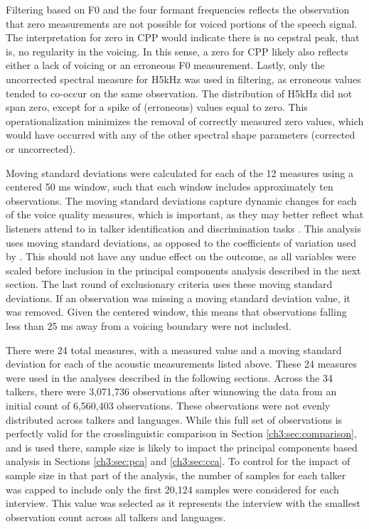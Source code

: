 Filtering based on F0 and the four formant frequencies reflects the observation that zero measurements are not possible for voiced portions of the speech signal. The interpretation for zero in CPP would indicate there is no cepstral peak, that is, no regularity in the voicing. In this sense, a zero for CPP likely also reflects either a lack of voicing or an erroneous F0 measurement. Lastly, only the uncorrected spectral measure for H5kHz was used in filtering, as erroneous values tended to co-occur on the same observation. The distribution of H5kHz did not span zero, except for a spike of (erroneous) values equal to zero. This operationalization minimizes the removal of correctly measured zero values, which would have occurred with any of the other spectral shape parameters (corrected or uncorrected). 

Moving standard deviations were calculated for each of the 12 measures using a centered 50 ms window, such that each window includes approximately ten observations. The moving standard deviations capture dynamic changes for each of the voice quality measures, which is important, as they may better reflect what listeners attend to in talker identification and discrimination tasks \citep{lee_2019_acoustic}. This analysis uses moving standard deviations, as opposed to the coefficients of variation used by \citet{lee_2019_acoustic}. This should not have any undue effect on the outcome, as all variables were scaled before inclusion in the principal components analysis described in the next section. The last round of exclusionary criteria uses these moving standard deviations. If an observation was missing a moving standard deviation value, it was removed. Given the centered window, this means that observations falling less than 25 ms away from a voicing boundary were not included. 

There were 24 total measures, with a measured value and a moving standard deviation for each of the acoustic measurements listed above. These 24 measures were used in the analyses described in the following sections. Across the 34 talkers, there were 3,071,736 observations after winnowing the data from an initial count of 6,560,403 observations. These observations were not evenly distributed across talkers and languages. While this full set of observations is perfectly valid for the crosslinguistic comparison in Section \ref{ch3:sec:comparison}, and is used there, sample size is likely to impact the principal components based analysis in Sections \ref{ch3:sec:pca} and \ref{ch3:sec:cca}. To control for the impact of sample size in that part of the analysis, the number of samples for each talker was capped to include only the first 20,124 samples were considered for each interview. This value was selected as it represents the interview with the smallest observation count across all talkers and languages. 

